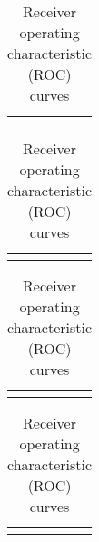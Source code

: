 \documentclass{article}
\begin{document}
\begin{table}[h!tbp]
    \centering
    \begin{tabular}{ccc}
      && \\
    \end{tabular}
    \caption{Receiver operating characteristic (ROC) curves}
\end{table}

\begin{table}[h!tbp]
    \centering
    \begin{tabular}{ccc}
      && \\
    \end{tabular}
    \caption{Receiver operating characteristic (ROC) curves}
\end{table}

\begin{table}[h!tbp]
    \centering
    \begin{tabular}{ccc}
      && \\
    \end{tabular}
    \caption{Receiver operating characteristic (ROC) curves}
\end{table}

\begin{table}[h!tbp]
    \centering
    \begin{tabular}{ccc}
      && \\
    \end{tabular}
    \caption{Receiver operating characteristic (ROC) curves}
\end{table}
\end{document}
